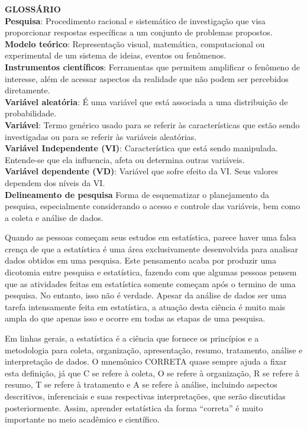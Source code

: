 \documentclass[
]{book}
\begin{document}
\textbf{GLOSSÁRIO}\\
\textbf{Pesquisa}: Procedimento racional e sistemático de investigação que visa proporcionar respostas específicas a um conjunto de problemas propostos.\\
\textbf{Modelo teórico}: Representação visual, matemática, computacional ou experimental de um sistema de ideias, eventos ou fenômenos.\\
\textbf{Instrumentos científicos}: Ferramentas que permitem amplificar o fenômeno de interesse, além de acessar aspectos da realidade que não podem ser percebidos diretamente.\\
\textbf{Variável aleatória}: É uma variável que está associada a uma distribuição de probabilidade.\\
\textbf{Variável}: Termo genérico usado para se referir às características que estão sendo investigadas ou para se referir às variáveis aleatórias.\\
\textbf{Variável Independente (VI)}: Característica que está sendo manipulada. Entende-se que ela influencia, afeta ou determina outras variáveis.\\
\textbf{Variável dependente (VD)}: Variável que sofre efeito da VI. Seus valores dependem dos níveis da VI.\\
\textbf{Delineamento de pesquisa} Forma de esquematizar o planejamento da pesquisa, especialmente considerando o acesso e controle das variáveis, bem como a coleta e análise de dados.

Quando as pessoas começam seus estudos em estatística, parece haver uma falsa crença de que a estatística é uma área exclusivamente desenvolvida para analisar dados obtidos em uma pesquisa. Este pensamento acaba por produzir uma dicotomia entre pesquisa e estatística, fazendo com que algumas pessoas pensem que as atividades feitas em estatística somente começam após o termino de uma pesquisa. No entanto, isso não é verdade. Apesar da análise de dados ser uma tarefa intensamente feita em estatística, a atuação desta ciência é muito mais ampla do que apenas isso e ocorre em todas as etapas de uma pesquisa.

Em linhas gerais, a estatística é a ciência que fornece os princípios e a metodologia para coleta, organização, apresentação, resumo, tratamento, análise e interpretação de dados. O mnemônico CORRETA quase sempre ajuda a fixar esta definição, já que C se refere à coleta, O se refere à organização, R se refere à resumo, T se refere à tratamento e A se refere à análise, incluindo aspectos descritivos, inferenciais e suas respectivas interpretações, que serão discutidas posteriormente. Assim, aprender estatística da forma ``correta'' é muito importante no meio acadêmico e científico.
\end{document}
